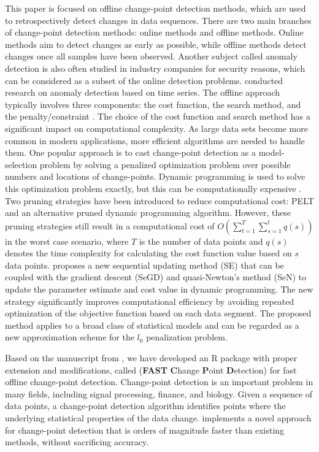 \documentclass[article]{jss}
\begin{document}
This paper is focused on offline change-point detection methods, which are used
to retrospectively detect changes in data sequences. There are two main branches
of change-point detection methods: online methods and offline methods. Online
methods aim to detect changes as early as possible, while offline methods detect
changes once all samples have been observed. Another subject called anomaly
detection is also often studied in industry companies for security reasons,
which can be considered as a subset of the online detection problems.
\cite{shipmon2017time} conducted research on anomaly detection based on time
series. The offline approach typically
involves three components: the cost function, the search method, and the
penalty/constraint \cite{truong2020selective}. The choice of the cost function
and search method has a
significant impact on computational complexity. As large data sets become more
common in modern applications, more efficient algorithms are needed to handle
them. One popular approach is to cast change-point detection as a
model-selection problem by solving a penalized optimization problem over
possible numbers and locations of change-points. Dynamic programming is used to
solve this optimization problem exactly, but this can be computationally
expensive \cite{auger1989algorithms, jackson2005algorithm}. Two pruning
strategies \cite{killick2012optimal, rigaill2010pruned} have been introduced to
reduce computational
cost: PELT and an alternative pruned dynamic programming algorithm. However,
these pruning strategies still result in a computational cost of
$O(\sum_{t = 1}^T \sum_{s = 1}^t q(s))$
in the worst case scenario, where $T$ is the number of data points and $q(s)$
denotes the time complexity for calculating the cost function value based on $s$
data points. \cite{zhang2022sequential} proposes a new sequential updating
method (SE)
that can be coupled with the gradient descent (SeGD) and quasi-Newton's method
(SeN) to update the parameter estimate and cost value in dynamic programming.
The new strategy significantly improves computational efficiency by avoiding
repeated optimization of the objective function based on each data segment. The
proposed method applies to a broad class of statistical models and can be
regarded as a new approximation scheme for the $l_0$ penalization problem.

Based on the manuscript from \citep{zhang2022sequential}, we have developed an
R package with proper extension and modifications, called
 (\textbf{FAST} \textbf{C}hange \textbf{P}oint \textbf{D}etection)
for fast offline change-point detection.
Change-point detection is an important problem in many fields, including signal
processing, finance, and biology. Given a sequence of data points, a
change-point detection algorithm identifies points where the underlying
statistical properties of the data change.  implements a novel
approach for change-point detection that is orders of magnitude faster than
existing methods, without sacrificing accuracy.
\end{document}

